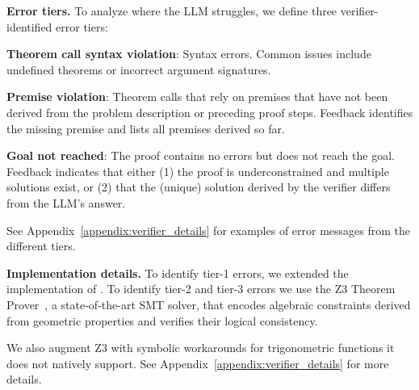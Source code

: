 \noindent\textbf{Error tiers.}
To analyze where the LLM struggles, we define three verifier-identified error tiers:

\begin{compactenum}
    \item \textbf{Theorem call syntax violation}: Syntax errors. Common issues include undefined theorems  or  incorrect argument signatures. 

    \item \textbf{Premise violation}: Theorem calls that rely on premises that have not been derived from the problem description or preceding proof steps. %
    Feedback identifies the missing premise and lists all premises derived so far.

    \item \textbf{Goal not reached}: The proof contains no errors but does not reach the goal.  
    Feedback indicates that either (1) the proof is underconstrained and multiple solutions exist, or (2) that the (unique) solution derived by the verifier differs from the LLM's answer.
\end{compactenum}
\noindent See Appendix~\ref{appendix:verifier_details} for examples of error messages from the different tiers. 

\noindent\textbf{Implementation details.}
To identify tier-1 errors, we extended the  implementation of \citet{zhang2023formalgeo}. 
To identify tier-2 and tier-3 errors we use the Z3 Theorem Prover~\cite{de2008z3}, a state-of-the-art SMT solver, that encodes algebraic constraints derived from geometric properties and verifies their logical consistency.

We also augment Z3 with symbolic workarounds for trigonometric functions it does not natively support.
See Appendix~\ref{appendix:verifier_details} for more details.



